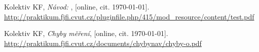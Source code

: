 
\begin{thebibliography}{9}
 Kolektiv KF, \emph{Návod: \Title}, [online, cit. \today]. \newline \url{http://praktikum.fjfi.cvut.cz/pluginfile.php/415/mod\_resource/content/test.pdf}

 Kolektiv KF, \emph{Chyby měření}, [online, cit. \today]. \newline \url{http://praktikum.fjfi.cvut.cz/documents/chybynav/chyby-o.pdf}

\end{thebibliography}
